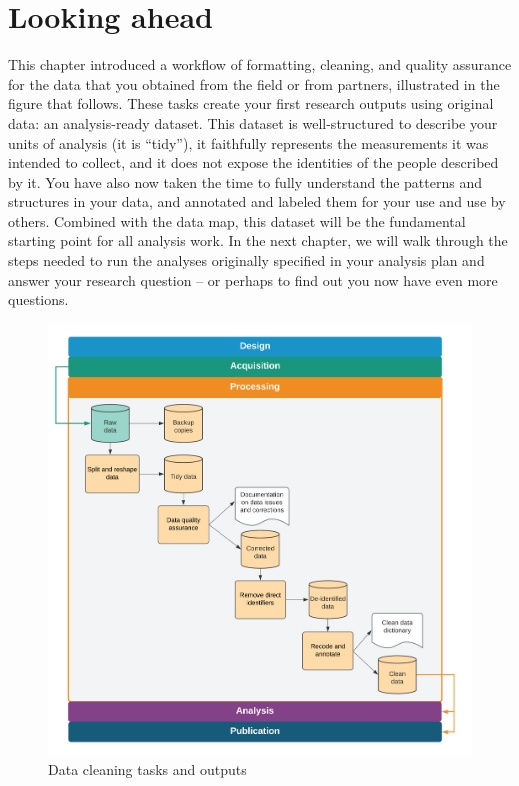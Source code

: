 \documentclass[
]{book}
\begin{document}
\hypertarget{looking-ahead-5}{%
\section*{Looking ahead}\label{looking-ahead-5}}

This chapter introduced a workflow of formatting, cleaning, and quality assurance for
the data that you obtained from the field or from partners,
illustrated in the figure that follows.
These tasks create your first research outputs using original data:
an analysis-ready dataset.
This dataset is well-structured to describe your units of analysis (it is ``tidy''),
it faithfully represents the measurements it was intended to collect,
and it does not expose the identities of the people described by it.
You have also now taken the time to fully understand the patterns and structures
in your data, and annotated and labeled them for your use and use by others.
Combined with the data map, this dataset
will be the fundamental starting point for all analysis work.
In the next chapter, we will walk through the steps needed
to run the analyses originally specified in your analysis plan
and answer your research question --
or perhaps to find out you now have even more questions.

\begin{figure}
\includegraphics[width=34.9in]{diagrams/Cleaning} \caption{Data cleaning tasks and outputs}\label{fig:unnamed-chunk-34}
\end{figure}
\end{document}
